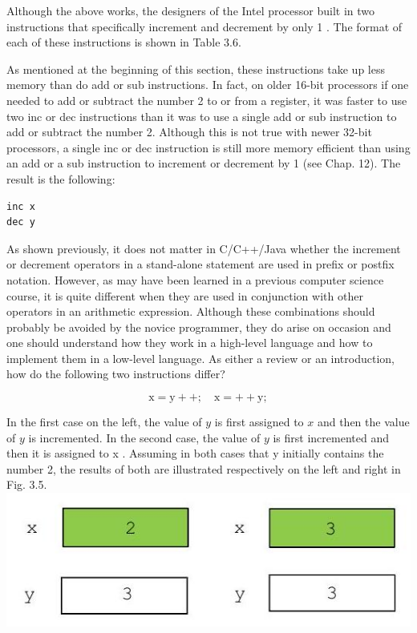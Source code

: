 \documentclass[10pt]{article}
\begin{document}
Although the above works, the designers of the Intel processor built in two instructions that specifically increment and decrement by only 1 . The format of each of these instructions is shown in Table 3.6.

As mentioned at the beginning of this section, these instructions take up less memory than do add or sub instructions. In fact, on older 16-bit processors if one needed to add or subtract the number 2 to or from a register, it was faster to use two inc or dec instructions than it was to use a single add or sub instruction to add or subtract the number 2. Although this is not true with newer 32-bit processors, a single inc or dec instruction is still more memory efficient than using an add or a sub instruction to increment or decrement by 1 (see Chap. 12). The result is the following:

\begin{verbatim}
inc x
dec y
\end{verbatim}

As shown previously, it does not matter in C/C++/Java whether the increment or decrement operators in a stand-alone statement are used in prefix or postfix notation. However, as may have been learned in a previous computer science course, it is quite different when they are used in conjunction with other operators in an arithmetic expression. Although these combinations should probably be avoided by the novice programmer, they do arise on occasion and one should understand how they work in a high-level language and how to implement them in a low-level language. As either a review or an introduction, how do the following two instructions differ?

$$
\mathrm{x}=\mathrm{y}++; \quad \mathrm{x}=++\mathrm{y} ;
$$

In the first case on the left, the value of $y$ is first assigned to $x$ and then the value of $y$ is incremented. In the second case, the value of $y$ is first incremented and then it is assigned to x . Assuming in both cases that y initially contains the number 2, the results of both are illustrated respectively on the left and right in Fig. 3.5.\\
\includegraphics[max width=\textwidth, center]{2025_03_24_ebe50cc223a6fbc49eecg-054}
\end{document}
